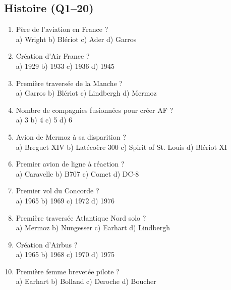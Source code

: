 
\subsection*{Histoire (Q1--20)}

\begin{enumerate}[nosep]
\item Père de l'aviation en France ? \\ a) Wright \quad b) Blériot \quad c) Ader \quad d) Garros

\item Création d'Air France ? \\ a) 1929 \quad b) 1933 \quad c) 1936 \quad d) 1945

\item Première traversée de la Manche ? \\ a) Garros \quad b) Blériot \quad c) Lindbergh \quad d) Mermoz

\item Nombre de compagnies fusionnées pour créer AF ? \\ a) 3 \quad b) 4 \quad c) 5 \quad d) 6

\item Avion de Mermoz à sa disparition ? \\ a) Breguet XIV \quad b) Latécoère 300 \quad c) Spirit of St. Louis \quad d) Blériot XI

\item Premier avion de ligne à réaction ? \\ a) Caravelle \quad b) B707 \quad c) Comet \quad d) DC-8

\item Premier vol du Concorde ? \\ a) 1965 \quad b) 1969 \quad c) 1972 \quad d) 1976

\item Première traversée Atlantique Nord solo ? \\ a) Mermoz \quad b) Nungesser \quad c) Earhart \quad d) Lindbergh

\item Création d'Airbus ? \\ a) 1965 \quad b) 1968 \quad c) 1970 \quad d) 1975

\item Première femme brevetée pilote ? \\ a) Earhart \quad b) Bolland \quad c) Deroche \quad d) Boucher


\end{enumerate}
